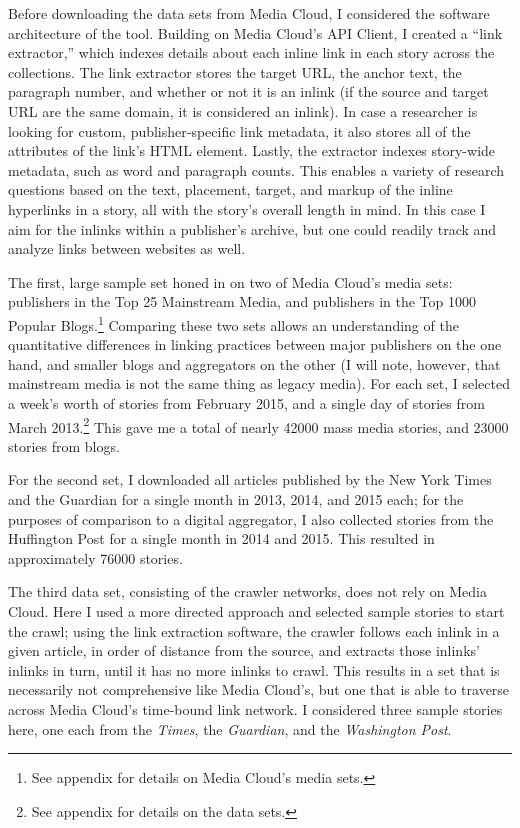 Before downloading the data sets from Media Cloud, I considered the software architecture of the tool. Building on Media Cloud's API Client, I created a ``link extractor,'' which indexes details about each inline link in each story across the collections. The link extractor stores the target URL, the anchor text, the paragraph number, and whether or not it is an inlink (if the source and target URL are the same domain, it is considered an inlink). In case a researcher is looking for custom, publisher-specific link metadata, it also stores all of the attributes of the link's HTML element. Lastly, the extractor indexes story-wide metadata, such as word and paragraph counts. This enables a variety of research questions based on the text, placement, target, and markup of the inline hyperlinks in a story, all with the story's overall length in mind. In this case I aim for the inlinks within a publisher's archive, but one could readily track and analyze links between websites as well.

The first, large sample set honed in on two of Media Cloud's media sets: publishers in the Top 25 Mainstream Media, and publishers in the Top 1000 Popular Blogs.\footnote{See appendix for details on Media Cloud's media sets.} Comparing these two sets allows an understanding of the quantitative differences in linking practices between major publishers on the one hand, and smaller blogs and aggregators on the other (I will note, however, that mainstream media is not the same thing as legacy media). For each set, I selected a week's worth of stories from February 2015, and a single day of stories from March 2013.\footnote{See appendix for details on the data sets.} This gave me a total of nearly 42000 mass media stories, and 23000 stories from blogs.

For the second set, I downloaded all articles published by the New York Times and the Guardian for a single month in 2013, 2014, and 2015 each; for the purposes of comparison to a digital aggregator, I also collected stories from the Huffington Post for a single month in 2014 and 2015. This resulted in approximately 76000 stories.

The third data set, consisting of the crawler networks, does not rely on Media Cloud. Here I used a more directed approach and selected sample stories to start the crawl; using the link extraction software, the crawler follows each inlink in a given article, in order of distance from the source, and extracts those inlinks' inlinks in turn, until it has no more inlinks to crawl. This results in a set that is necessarily not comprehensive like Media Cloud's, but one that is able to traverse across Media Cloud's time-bound link network. I considered three sample stories here, one each from the \emph{Times}, the \emph{Guardian}, and the \emph{Washington Post}.

